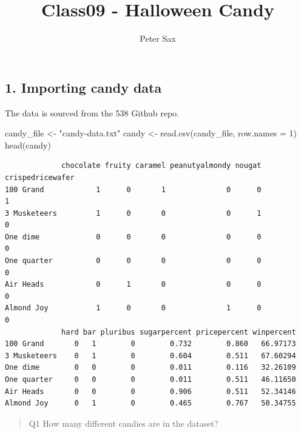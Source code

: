 \documentclass[
  letterpaper,
  DIV=11,
  numbers=noendperiod]{scrartcl}
\title{Class09 - Halloween Candy}
\author{Peter Sax}
\date{}
\newenvironment{Shaded}{\begin{snugshade}}{\end{snugshade}}
\newcommand{\AttributeTok}[1]{\textcolor[rgb]{0.40,0.45,0.13}{#1}}
\newcommand{\DecValTok}[1]{\textcolor[rgb]{0.68,0.00,0.00}{#1}}
\newcommand{\FunctionTok}[1]{\textcolor[rgb]{0.28,0.35,0.67}{#1}}
\newcommand{\NormalTok}[1]{\textcolor[rgb]{0.00,0.23,0.31}{#1}}
\newcommand{\OtherTok}[1]{\textcolor[rgb]{0.00,0.23,0.31}{#1}}
\newcommand{\StringTok}[1]{\textcolor[rgb]{0.13,0.47,0.30}{#1}}
\renewcommand*\contentsname{Table of contents}
\newcommand\contentsname{Table of contents}
\begin{document}
\maketitle

\renewcommand*\contentsname{Table of contents}
{
\hypersetup{linkcolor=}
\setcounter{tocdepth}{3}
\tableofcontents
}

\subsection{1. Importing candy data}\label{importing-candy-data}

The data is sourced from the 538 Github repo.

\begin{Shaded}
\begin{Highlighting}[]
\NormalTok{candy\_file }\OtherTok{\textless{}{-}} \StringTok{"candy{-}data.txt"}
\NormalTok{candy }\OtherTok{\textless{}{-}} \FunctionTok{read.csv}\NormalTok{(candy\_file, }\AttributeTok{row.names =} \DecValTok{1}\NormalTok{)}
\FunctionTok{head}\NormalTok{(candy)}
\end{Highlighting}
\end{Shaded}

\begin{verbatim}
             chocolate fruity caramel peanutyalmondy nougat crispedricewafer
100 Grand            1      0       1              0      0                1
3 Musketeers         1      0       0              0      1                0
One dime             0      0       0              0      0                0
One quarter          0      0       0              0      0                0
Air Heads            0      1       0              0      0                0
Almond Joy           1      0       0              1      0                0
             hard bar pluribus sugarpercent pricepercent winpercent
100 Grand       0   1        0        0.732        0.860   66.97173
3 Musketeers    0   1        0        0.604        0.511   67.60294
One dime        0   0        0        0.011        0.116   32.26109
One quarter     0   0        0        0.011        0.511   46.11650
Air Heads       0   0        0        0.906        0.511   52.34146
Almond Joy      0   1        0        0.465        0.767   50.34755
\end{verbatim}

\begin{quote}
Q1 How many different candies are in the dataset?
\end{quote}
\end{document}

